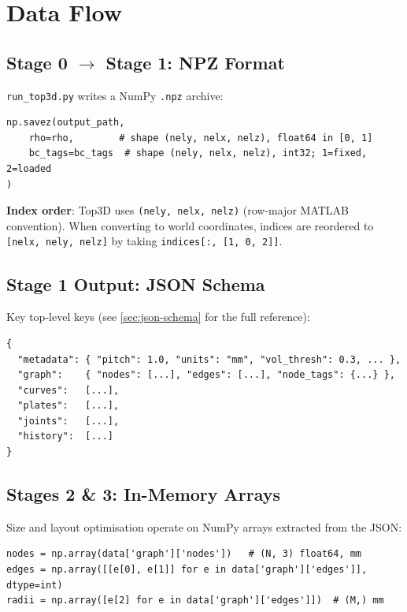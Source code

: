 \documentclass[a4paper, 11pt, openany]{report}
\begin{document}
\section{Data Flow}
\label{sec:data-flow}

\subsection{Stage 0 \texorpdfstring{$\to$}{to} Stage 1: NPZ Format}

\texttt{run\_top3d.py} writes a NumPy \texttt{.npz} archive:

\begin{lstlisting}[style=pythonstyle]
np.savez(output_path,
    rho=rho,        # shape (nely, nelx, nelz), float64 in [0, 1]
    bc_tags=bc_tags  # shape (nely, nelx, nelz), int32; 1=fixed, 2=loaded
)
\end{lstlisting}

\textbf{Index order}: Top3D uses \texttt{(nely, nelx, nelz)} (row-major MATLAB
convention).  When converting to world coordinates, indices are reordered to
\texttt{[nelx, nely, nelz]} by taking \texttt{indices[:, [1, 0, 2]]}.


\subsection{Stage 1 Output: JSON Schema}

Key top-level keys (see \cref{sec:json-schema} for the full reference):

\begin{lstlisting}[style=textstyle]
{
  "metadata": { "pitch": 1.0, "units": "mm", "vol_thresh": 0.3, ... },
  "graph":    { "nodes": [...], "edges": [...], "node_tags": {...} },
  "curves":   [...],
  "plates":   [...],
  "joints":   [...],
  "history":  [...]
}
\end{lstlisting}


\subsection{Stages 2 \texorpdfstring{\&}{and} 3: In-Memory Arrays}

Size and layout optimisation operate on NumPy arrays extracted from the JSON:

\begin{lstlisting}[style=pythonstyle]
nodes = np.array(data['graph']['nodes'])   # (N, 3) float64, mm
edges = np.array([[e[0], e[1]] for e in data['graph']['edges']], dtype=int)
radii = np.array([e[2] for e in data['graph']['edges']])  # (M,) mm
\end{lstlisting}
\end{document}

